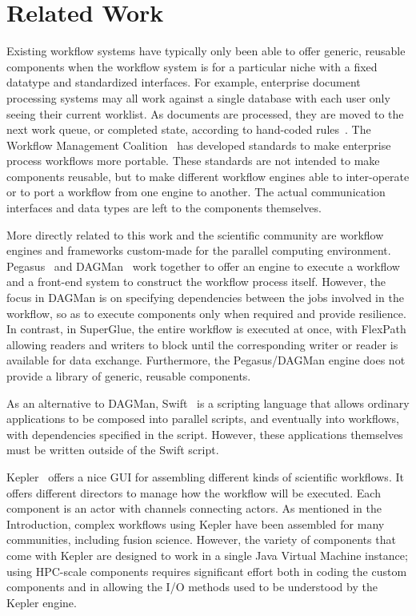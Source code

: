 \documentclass[conference]{IEEEtran}
\begin{document}
\section{Related Work}
\label{s:related}

Existing workflow systems have typically only been able to offer generic,
reusable components when the workflow system is for a particular niche with a
fixed datatype and standardized interfaces. For example, enterprise document
processing systems may all work against a single database with each user only
seeing their current worklist. As documents are processed, they are moved to
the next work queue, or completed state, according to hand-coded
rules~\cite{mckesson-workflow}. The Workflow Management Coalition~\cite{wfmc}
has developed standards to make enterprise process workflows more portable.
These standards are not intended to make components reusable, but to make
different workflow engines able to inter-operate or to port a workflow from one
engine to another.  The actual communication interfaces and data types are left
to the components themselves.

More directly related to this work and the scientific community are workflow
engines and frameworks custom-made for the parallel computing environment.
Pegasus~\cite{mullender:pegasus} and DAGMan~\cite{Malewicz:2006:dagman} work
together to offer an engine to execute a workflow and a front-end system to
construct the workflow process itself.
However, the focus in DAGMan is on specifying dependencies between
the jobs involved in the workflow, so as to execute
components only when required and provide resilience.
In contrast, in SuperGlue, the entire workflow is executed at once, with
FlexPath allowing readers and writers to block until
the corresponding writer or reader is available for data exchange.
Furthermore, the Pegasus/DAGMan engine does not provide
a library of generic, reusable components.

As an alternative to DAGMan, Swift~\cite{wilde2011swift}
is a scripting language that allows ordinary applications
to be composed into parallel scripts, and eventually into
workflows, with dependencies specified in the script.
However, these applications themselves
must be written outside of the Swift script.

Kepler~\cite{bertram:2006:kepler} offers a nice GUI for assembling different
kinds of scientific workflows. It offers different directors to manage how the
workflow will be executed. Each component is an actor with channels connecting
actors. As mentioned in the Introduction, complex workflows using Kepler have been
assembled for many communities, including fusion science.
However, the variety of components
that come with Kepler are designed
to work in a single Java Virtual Machine instance;
using HPC-scale components requires significant effort
both in coding the custom components and in
allowing the I/O methods used to be understood by the Kepler engine.
\end{document}
